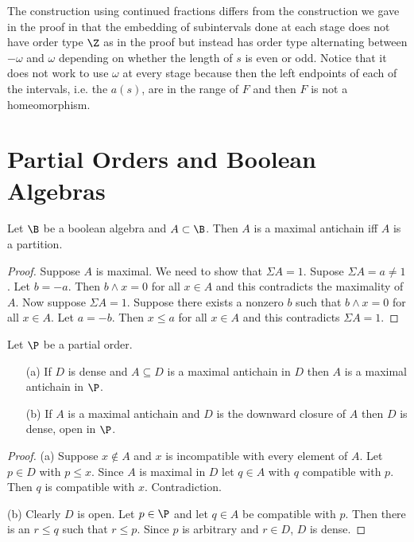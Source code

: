 \documentclass[oneside,12pt]{amsart}
\begin{document}
The construction using continued fractions differs from the construction we gave in the proof
in that the embedding of subintervals done at each stage does not have order type $\Z$ as in the proof but instead
has order type alternating between $-\omega$ and $\omega$ depending on whether the length of $s$ is even or odd.
Notice that it does not work to use $\omega$ at every stage because then the left
endpoints of each of the intervals, i.e. the $a(s)$, are in the range
of $F$ and then $F$ is not a homeomorphism.


\section{Partial Orders and Boolean Algebras}

\begin{lemma}
Let $\B$ be a boolean algebra and $A\subset\B$. Then $A$ is a maximal antichain iff $A$ is a partition.
\end{lemma}
\begin{proof}
Suppose $A$ is maximal. We need to show that $\Sigma A = 1$. Supose $\Sigma A = a \not= 1$. Let
$b = -a$. Then $b \wedge x = 0$ for all $x\in A$ and this contradicts the maximality of $A$. Now suppose
$\Sigma A = 1$. Suppose there exists a nonzero $b$ such that $b \wedge x = 0$ for all $x\in A$. Let
$a = -b$. Then $x\leq a$ for all $x \in A$ and this contradicts $\Sigma A = 1$.
\end{proof}

\begin{lemma}
Let $\P$ be a partial order.
\begin{itemize}
\item[(a)] If $D$ is dense and $A\subseteq D$ is a maximal antichain
in $D$ then $A$ is a maximal antichain in $\P$.
\item[(b)] If $A$ is a maximal antichain and $D$ is the downward closure
of $A$ then $D$ is dense, open in $\P$.
\end{itemize}
\end{lemma}
\begin{proof}
(a) Suppose $x\notin A$ and $x$ is incompatible with every element of $A$.
Let $p\in D$ with $p\leq x$. Since $A$ is maximal in $D$ let $q\in A$ with
$q$ compatible with $p$. Then $q$ is compatible with $x$. Contradiction.

(b) Clearly $D$ is open. Let $p \in \P$ and let $q\in A$ be compatible with $p$.
Then there is an $r\leq q$ such that $r\leq p$. Since $p$ is arbitrary and $r\in D$,
$D$ is dense.
\end{proof}
\end{document}
